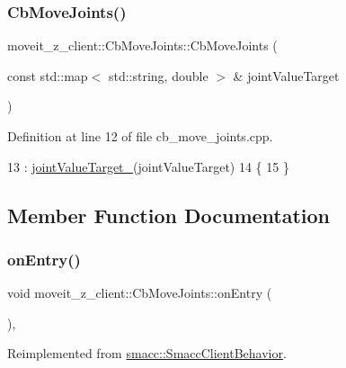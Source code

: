 \subsubsection{\texorpdfstring{Cb\+Move\+Joints()}{CbMoveJoints()}\hspace{0.1cm}{\footnotesize\ttfamily [2/2]}}
{\footnotesize\ttfamily moveit\+\_\+z\+\_\+client\+::\+Cb\+Move\+Joints\+::\+Cb\+Move\+Joints (\begin{DoxyParamCaption}\item[{const std\+::map$<$ std\+::string, double $>$ \&}]{joint\+Value\+Target }\end{DoxyParamCaption})}



Definition at line 12 of file cb\+\_\+move\+\_\+joints.\+cpp.


\begin{DoxyCode}
13     : \hyperlink{classmoveit__z__client_1_1CbMoveJoints_a0f52577dd2fccf25f36c4c93e733c0f4}{jointValueTarget\_}(jointValueTarget)
14 \{
15 \}
\end{DoxyCode}


\subsection{Member Function Documentation}
\mbox{\label{classmoveit__z__client_1_1CbMoveJoints_a512e97e94ab05ee12837433e5d921095}} 
\subsubsection{\texorpdfstring{on\+Entry()}{onEntry()}}
{\footnotesize\ttfamily void moveit\+\_\+z\+\_\+client\+::\+Cb\+Move\+Joints\+::on\+Entry (\begin{DoxyParamCaption}{ }\end{DoxyParamCaption})\hspace{0.3cm}{\ttfamily [override]}, {\ttfamily [virtual]}}



Reimplemented from \hyperlink{classsmacc_1_1SmaccClientBehavior_a7962382f93987c720ad432fef55b123f}{smacc\+::\+Smacc\+Client\+Behavior}.



